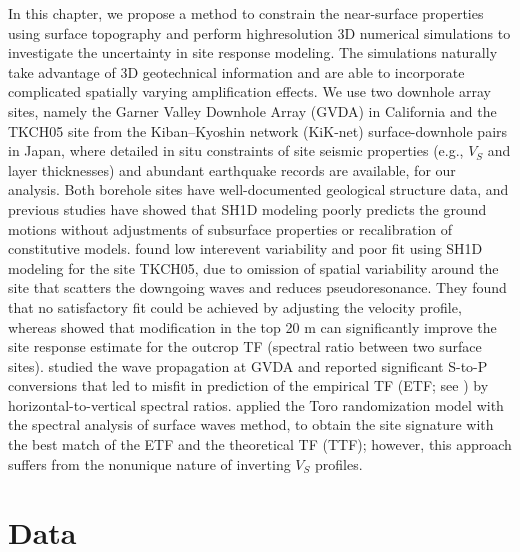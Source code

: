 {In this chapter, we propose a method to constrain the near-surface properties using surface topography and perform highresolution 3D numerical simulations to investigate the uncertainty in site response modeling. The simulations naturally take advantage of 3D geotechnical information and are able to incorporate complicated spatially varying amplification effects. We use two downhole array sites, namely the Garner Valley Downhole Array (GVDA) in California and the TKCH05 site from the Kiban–Kyoshin network (KiK-net) surface-downhole pairs in Japan, where detailed in situ constraints of site seismic properties (e.g., $V_S$ and layer thicknesses) and abundant earthquake records are available, for our analysis. Both borehole sites have well-documented geological structure data, and previous studies have showed that SH1D modeling poorly predicts the ground motions without adjustments of subsurface properties or recalibration of constitutive models. \citet{thompsonTaxonomySiteResponse2012} found low interevent variability and poor fit using SH1D modeling for the site TKCH05, due to omission of spatial variability around the site that scatters the downgoing waves and reduces pseudoresonance. They found that no satisfactory fit could be achieved by adjusting the velocity profile, whereas \citet{taoTaxonomyEvaluatingSitespecific2020} showed that modification in the top 20 m can significantly improve the site response estimate for the outcrop TF (spectral ratio between two surface sites). \citet{bonillaBoreholeResponseStudies2002} studied the wave propagation at GVDA and reported significant S-to-P conversions that led to misfit in prediction of the empirical TF (ETF; see ) by horizontal-to-vertical spectral ratios. \citet{teagueMeasuredVsPredicted2018} applied the Toro randomization model \citep{toroProbabilisticModelsSite1995} with the spectral analysis of surface waves method, to obtain the site signature with the best match of the ETF and the theoretical TF (TTF); however, this approach suffers from the nonunique nature of inverting $V_S$ profiles.


\section{Data}\label{etf:data}

}
